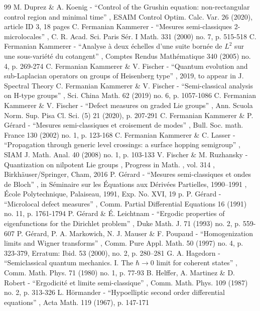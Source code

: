 \begin{thebibliography}{99}
 M. Duprez \& A. Koenig - “Control of the Grushin equation: non-rectangular control region and minimal time” , ESAIM Control Optim. Calc. Var. 26 (2020), article ID 3, 18 pages
 C. Fermanian Kammerer - “Mesures semi-classiques 2-microlocales” , C. R. Acad. Sci. Paris Sér. I Math. 331 (2000) no. 7, p. 515-518
 C. Fermanian Kammerer - “Analyse à deux échelles d’une suite bornée de $L^2$ sur une sous-variété du cotangent” , Comptes Rendus Mathématique 340 (2005) no. 4, p. 269-274
 C. Fermanian Kammerer \& V. Fischer - “Quantum evolution and sub-Laplacian operators on groups of Heisenberg type” , 2019, to appear in J. Spectral Theory
 C. Fermanian Kammerer \& V. Fischer - “Semi-classical analysis on H-type groups” , Sci. China Math. 62 (2019) no. 6, p. 1057-1086
 C. Fermanian Kammerer \& V. Fischer - “Defect measures on graded Lie groups” , Ann. Scuola Norm. Sup. Pisa Cl. Sci. (5) 21 (2020), p. 207-291
 C. Fermanian Kammerer \& P. Gérard - “Mesures semi-classiques et croisement de modes” , Bull. Soc. math. France 130 (2002) no. 1, p. 123-168
 C. Fermanian Kammerer \& C. Lasser - “Propagation through generic level crossings: a surface hopping semigroup” , SIAM J. Math. Anal. 40 (2008) no. 1, p. 103-133
 V. Fischer \& M. Ruzhansky - Quantization on nilpotent Lie groups , Progress in Math. , vol. 314 , Birkhäuser/Springer, Cham, 2016
 P. Gérard - “Mesures semi-classiques et ondes de Bloch” , in Séminaire sur les Équations aux Dérivées Partielles, 1990–1991 , École Polytechnique, Palaiseau, 1991, Exp. No. XVI, 19 p.
 P. Gérard - “Microlocal defect measures” , Comm. Partial Differential Equations 16 (1991) no. 11, p. 1761-1794
 P. Gérard \& É. Leichtnam - “Ergodic properties of eigenfunctions for the Dirichlet problem” , Duke Math. J. 71 (1993) no. 2, p. 559-607
 P. Gérard, P. A. Markowich, N. J. Mauser \& F. Poupaud - “Homogenization limits and Wigner transforms” , Comm. Pure Appl. Math. 50 (1997) no. 4, p. 323-379, Erratum: Ibid. 53 (2000), no. 2, p. 280–281
 G. A. Hagedorn - “Semiclassical quantum mechanics. I. The $\hbar \rightarrow 0$ limit for coherent states” , Comm. Math. Phys. 71 (1980) no. 1, p. 77-93
 B. Helffer, A. Martinez \& D. Robert - “Ergodicité et limite semi-classique” , Comm. Math. Phys. 109 (1987) no. 2, p. 313-326
 L. Hörmander - “Hypoelliptic second order differential equations” , Acta Math. 119 (1967), p. 147-171

\end{thebibliography}
